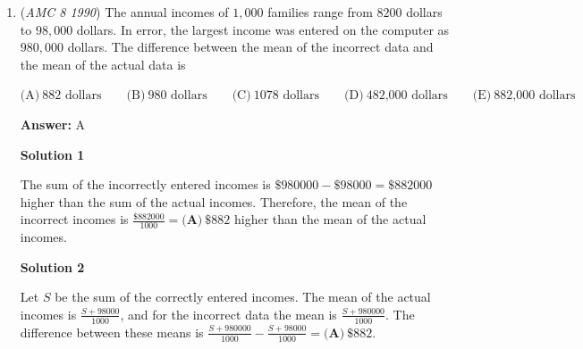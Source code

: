 \begin{enumerate}
 Therefore, a qualifying arrangement has at least $\boxed{\textbf{(B)}\ 40}$ occupied seats.

 



\textbf{Solution 2}

Consider a row of chairs with $n$ occupied seats such that each empty seat is next to an occupied seat.  Then there are at most $2$ empty seats between any of the $n-1$ pairs of consecutive occupied seats, at most $1$ empty seat before the first occupied seat and at most $1$ empty seat after the last occupied seat.  Therefore, the row must have at most $n + 2(n-1) + 2 = 3n$ chairs in total.  

 Therefore, a row with $39$ or fewer occupied seats may have at most $39 \cdot 3 = 117$ seats, which is too few.  A row with $\boxed{\textbf{(B)}\ 40}$ occupied seats and $120$ total seats can be created by placing $1$ empty seat on each end and $2$ empty seats between each pair of consecutive occupied seats.

 


	\item (\textit{AMC 8 1990}) The annual incomes of $1,000$ families range from $8200$ dollars to $98,000$ dollars.  In error, the largest income was entered on the computer as $980,000$ dollars.  The difference between the mean of the incorrect data and the mean of the actual data is


 $\text{(A)}\ \text{882 dollars} \qquad \text{(B)}\ \text{980 dollars} \qquad \text{(C)}\ \text{1078 dollars} \qquad \text{(D)}\ \text{482,000 dollars} \qquad \text{(E)}\ \text{882,000 dollars}$

 \textbf{Answer: }A



\textbf{Solution 1}

The sum of the incorrectly entered incomes is $\$980000-\$98000=\$882000$ higher than the sum of the actual incomes.  Therefore, the mean of the incorrect incomes is $\frac{\$882000}{1000} = \boxed{\textbf{(A)}\ \$882}$ higher than the mean of the actual incomes.

 



\textbf{Solution 2}

Let $S$ be the sum of the correctly entered incomes.  The mean of the actual incomes is $\frac{S+98000}{1000}$, and for the incorrect data the mean is $\frac{S+980000}{1000}$.  The difference between these means is $\frac{S+980000}{1000}-\frac{S+98000}{1000} = \boxed{\textbf{(A)}\ \$882}$.


\end{enumerate}
